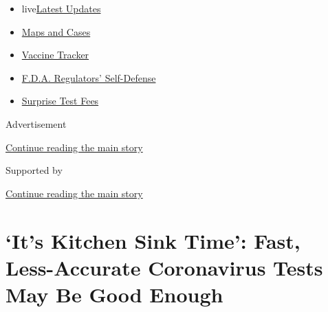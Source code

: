 \begin{itemize}
\tightlist
\item
  live\href{https://www.nytimes3xbfgragh.onion/2020/09/11/world/covid-19-coronavirus.html?name=styln-coronavirus-national\&region=TOP_BANNER\&block=storyline_menu_recirc\&action=click\&pgtype=Article\&impression_id=372474b1-f4b7-11ea-8a5e-83a68a0b9550\&variant=undefined}{Latest
  Updates}
\item
  \href{https://www.nytimes3xbfgragh.onion/interactive/2020/us/coronavirus-us-cases.html?name=styln-coronavirus-national\&region=TOP_BANNER\&block=storyline_menu_recirc\&action=click\&pgtype=Article\&impression_id=37249bc0-f4b7-11ea-8a5e-83a68a0b9550\&variant=undefined}{Maps
  and Cases}
\item
  \href{https://www.nytimes3xbfgragh.onion/interactive/2020/science/coronavirus-vaccine-tracker.html?name=styln-coronavirus-national\&region=TOP_BANNER\&block=storyline_menu_recirc\&action=click\&pgtype=Article\&impression_id=37249bc1-f4b7-11ea-8a5e-83a68a0b9550\&variant=undefined}{Vaccine
  Tracker}
\item
  \href{https://www.nytimes3xbfgragh.onion/2020/09/10/us/politics/fda-coronavirus-vaccine.html?name=styln-coronavirus-national\&region=TOP_BANNER\&block=storyline_menu_recirc\&action=click\&pgtype=Article\&impression_id=37249bc2-f4b7-11ea-8a5e-83a68a0b9550\&variant=undefined}{F.D.A.
  Regulators' Self-Defense}
\item
  \href{https://www.nytimes3xbfgragh.onion/2020/09/09/upshot/coronavirus-surprise-test-fees.html?name=styln-coronavirus-national\&region=TOP_BANNER\&block=storyline_menu_recirc\&action=click\&pgtype=Article\&impression_id=37249bc3-f4b7-11ea-8a5e-83a68a0b9550\&variant=undefined}{Surprise
  Test Fees}
\end{itemize}

Advertisement

\protect\hyperlink{after-top}{Continue reading the main story}

Supported by

\protect\hyperlink{after-sponsor}{Continue reading the main story}

\hypertarget{its-kitchen-sink-time-fast-less-accurate-coronavirus-tests-may-be-good-enough}{%
\section{`It's Kitchen Sink Time': Fast, Less-Accurate Coronavirus Tests
May Be Good
Enough}\label{its-kitchen-sink-time-fast-less-accurate-coronavirus-tests-may-be-good-enough}}

